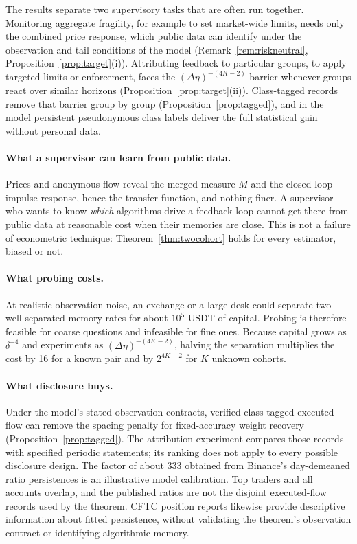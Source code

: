 \documentclass[12pt]{article}
\theoremstyle{definition}
\theoremstyle{remark}
\begin{document}
The results separate two supervisory tasks that are often run together. Monitoring aggregate fragility, for example to set market-wide limits, needs only the combined price response, which public data can identify under the observation and tail conditions of the model (Remark~\ref{rem:riskneutral}, Proposition~\ref{prop:target}(i)). Attributing feedback to particular groups, to apply targeted limits or enforcement, faces the $(\Delta\eta)^{-(4K-2)}$ barrier whenever groups react over similar horizons (Proposition~\ref{prop:target}(ii)). Class-tagged records remove that barrier group by group (Proposition~\ref{prop:tagged}), and in the model persistent pseudonymous class labels deliver the full statistical gain without personal data.


\paragraph{What a supervisor can learn from public data.} Prices and anonymous flow reveal the merged measure $M$ and the closed-loop impulse response, hence the transfer function, and nothing finer. A supervisor who wants to know \emph{which} algorithms drive a feedback loop cannot get there from public data at reasonable cost when their memories are close. This is not a failure of econometric technique: Theorem~\ref{thm:twocohort} holds for every estimator, biased or not.

\paragraph{What probing costs.} At realistic observation noise, an exchange or a large desk could separate two well-separated memory rates for about $10^5$ USDT of capital. Probing is therefore feasible for coarse questions and infeasible for fine ones. Because capital grows as $\delta^{-4}$ and experiments as $(\Delta\eta)^{-(4K-2)}$, halving the separation multiplies the cost by 16 for a known pair and by $2^{4K-2}$ for $K$ unknown cohorts.

\paragraph{What disclosure buys.} Under the model's stated observation contracts, verified class-tagged executed flow can remove the spacing penalty for fixed-accuracy weight recovery (Proposition~\ref{prop:tagged}). The attribution experiment compares those records with specified periodic statements; its ranking does not apply to every possible disclosure design. The factor of about 333 obtained from Binance's day-demeaned ratio persistences is an illustrative model calibration. Top traders and all accounts overlap, and the published ratios are not the disjoint executed-flow records used by the theorem. CFTC position reports likewise provide descriptive information about fitted persistence, without validating the theorem's observation contract or identifying algorithmic memory.
\end{document}
